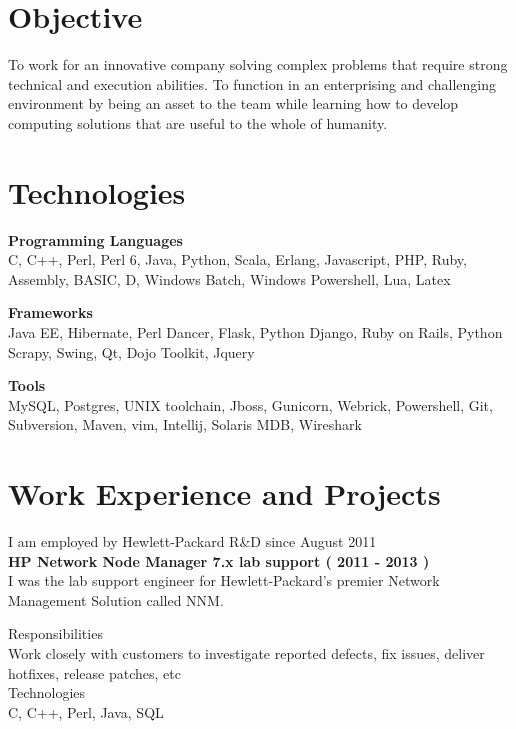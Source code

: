\documentclass[line,margin]{res}
\begin{document}


\address{joji\_antony@gmx.com}
\address{+91 96323 41954}

\begin{resume}
\section{Objective}
To work for an innovative company solving complex problems that require strong technical and execution abilities. To function in an enterprising and challenging environment by being an asset to the team while learning how to develop computing solutions that are useful to the whole of humanity.\\

\section{Technologies}

{\bf Programming Languages}\\
C, C++, Perl, Perl 6, Java, Python, Scala, Erlang, Javascript, PHP, Ruby, Assembly, BASIC, D, Windows Batch, Windows Powershell, Lua, Latex

{\bf Frameworks}\\
Java EE, Hibernate, Perl Dancer, Flask, Python Django, Ruby on Rails, Python Scrapy, Swing, Qt, Dojo Toolkit, Jquery 

{\bf Tools}\\
MySQL, Postgres, UNIX toolchain, Jboss, Gunicorn, Webrick, Powershell, Git, Subversion, Maven, vim, Intellij, Solaris MDB, Wireshark

\section{Work Experience and Projects}

I am employed by Hewlett-Packard R\&D since August 2011\\

{\bf HP Network Node Manager 7.x lab support ( 2011 - 2013 )}\\
I was the lab support engineer for Hewlett-Packard's premier Network Management Solution called NNM.

Responsibilities\\
Work closely with customers to investigate reported defects, fix issues, deliver hotfixes, release patches, etc\\

Technologies\\
C, C++, Perl, Java, SQL\\


\end{resume}
\end{document}
